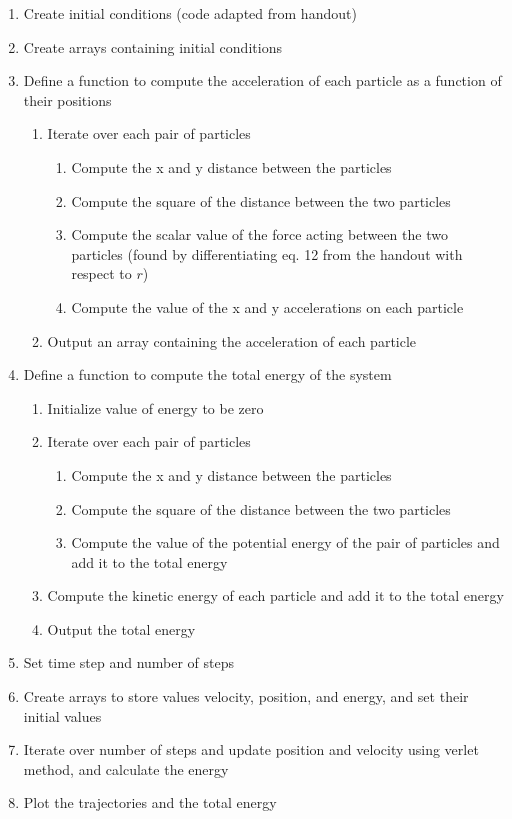 \documentclass{article}
\begin{document}
\begin{enumerate}
	\item Create initial conditions (code adapted from handout)
	\item Create arrays containing initial conditions
	\item Define a function to compute the acceleration of each particle as a function of their positions
	\begin{enumerate}[label*=\arabic*]
		\item Iterate over each pair of particles
		\begin{enumerate}[label*=\arabic*]
			\item Compute the x and y distance between the particles
			\item Compute the square of the distance between the two particles
			\item Compute the scalar value of the force acting between the two particles (found by differentiating eq. 12 from the handout with respect to $r$)
			\item Compute the value of the x and y accelerations on each particle
		\end{enumerate}
		\item Output an array containing the acceleration of each particle
	\end{enumerate}
	\item Define a function to compute the total energy of the system
	\begin{enumerate}[label*=\arabic*]
	\item Initialize value of energy to be zero
		\item Iterate over each pair of particles
		\begin{enumerate}[label*=\arabic*]
			\item Compute the x and y distance between the particles
			\item Compute the square of the distance between the two particles
			\item Compute the value of the potential energy of the pair of particles and add it to the total energy
		\end{enumerate}
		\item Compute the kinetic energy of each particle and add it to the total energy
		\item Output the total energy
	\end{enumerate}
	\item Set time step and number of steps
	\item Create arrays to store values velocity, position, and energy, and set their initial values
	\item Iterate over number of steps and update position and velocity using verlet method, and calculate the energy
	\item Plot the trajectories and the total energy
\end{enumerate}
\end{document}
